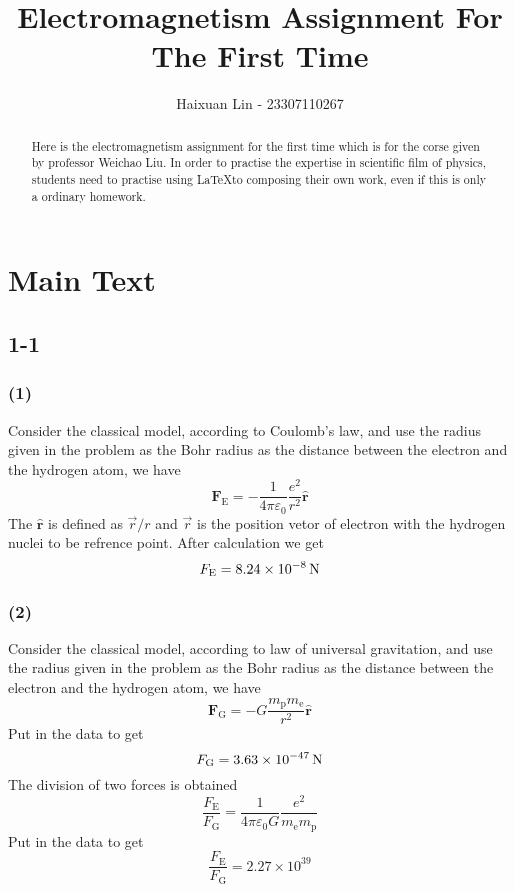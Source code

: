 \documentclass[a4paper,11pt]{amsart}
\title{Electromagnetism Assignment For The First Time}
\author{Haixuan Lin - 23307110267}
\theoremstyle{definition}
\begin{document}
	
	\begin{abstract}
		Here is the electromagnetism assignment for the first time which is for the corse given by professor Weichao Liu. In order to practise the expertise in scientific film of physics, students need to practise using \LaTeX to composing their own work, even if this is only a ordinary homework.
	\end{abstract}
	
	\maketitle
	\section*{Main Text}
	\subsection*{1-1}
	\subsubsection*{(1)}Consider the classical model, according to Coulomb's law, and use the radius given in the problem as the Bohr radius as the distance between the electron and the hydrogen atom, we have
	\begin{equation}
		\boldsymbol{F}_{\mathrm{E}}=-\dfrac{1}{4\pi \varepsilon _0}\frac{e^2}{r^2}\bm{\hat{r}}
	\end{equation}
	The $\bm{\hat{r}}$ is defined as $\vec{r}/r$ and $\vec{r}$ is the position vetor of electron with the hydrogen nuclei to be refrence point. After calculation we get
	\begin{equation}
		{F}_{\mathrm{E}}=8.24\times10^{-8}\thinspace\mathrm{N}
	\end{equation}
	\subsubsection*{(2)}Consider the classical model, according to law of universal gravitation, and use the radius given in the problem as the Bohr radius as the distance between the electron and the hydrogen atom, we have
	\begin{equation}
		\boldsymbol{F}_{\mathrm{G}}=-G\frac{m_\mathrm{p}m_{\mathrm{e}}}{r^2}\bm{\hat{r}}
	\end{equation}
	Put in the data to get
	\begin{equation}
		{F}_{\mathrm{G}}=3.63\times10^{-47}\thinspace\mathrm{N}
	\end{equation}
	The division of two forces is obtained
	\begin{equation}
		\frac{F_{\mathrm{E}}}{F_{\mathrm{G}}}=\frac{1}{4\pi \varepsilon _0G}\frac{e^2}{m_{\mathrm{e}}m_{\mathrm{p}}}
	\end{equation}
	Put in the data to get
	\begin{equation}
		\frac{F_{\mathrm{E}}}{F_{\mathrm{G}}}=2.27\times10^{39}
	\end{equation}
\end{document}
